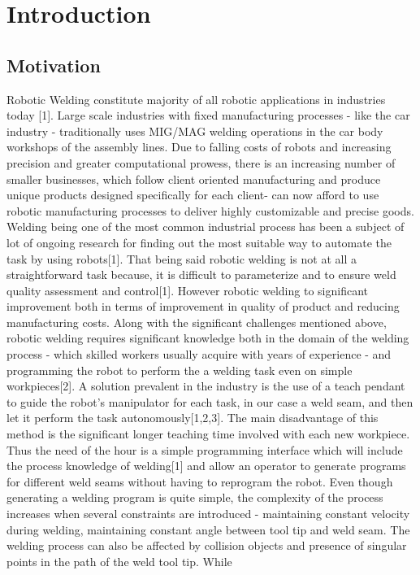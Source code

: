 \section{Introduction}
\subsection{Motivation}
Robotic Welding constitute majority of all robotic applications in industries today [1]. Large scale
industries with fixed manufacturing processes - like the car industry - traditionally uses MIG/MAG
welding operations in the car body workshops of the assembly lines. Due to falling costs of
robots and increasing precision and greater computational prowess, there is an increasing
number of smaller businesses, which follow client oriented manufacturing and produce unique
products designed specifically for each client- can now afford to use robotic manufacturing
processes to deliver highly customizable and precise goods.
Welding being one of the most common industrial process has been a subject of lot of ongoing
research for finding out the most suitable way to automate the task by using robots[1]. That
being said robotic welding is not at all a straightforward task because, it is difficult to
parameterize and to ensure weld quality assessment and control[1]. However robotic welding to
significant improvement both in terms of improvement in quality of product and reducing
manufacturing costs.
Along with the significant challenges mentioned above, robotic welding requires significant
knowledge both in the domain of the welding process - which skilled workers usually acquire
with years of experience - and programming the robot to perform the a welding task even on
simple workpieces[2]. A solution prevalent in the industry is the use of a teach pendant to guide
the robot’s manipulator for each task, in our case a weld seam, and then let it perform the task
autonomously[1,2,3]. The main disadvantage of this method is the significant longer teaching
time involved with each new workpiece. Thus the need of the hour is a simple programming
interface which will include the process knowledge of welding[1] and allow an operator to
generate programs for different weld seams without having to reprogram the robot. Even
though generating a welding program is quite simple, the complexity of the process increases
when several constraints are introduced - maintaining constant velocity during welding,
maintaining constant angle between tool tip and weld seam. The welding process can also be
affected by collision objects and presence of singular points in the path of the weld tool tip. While

